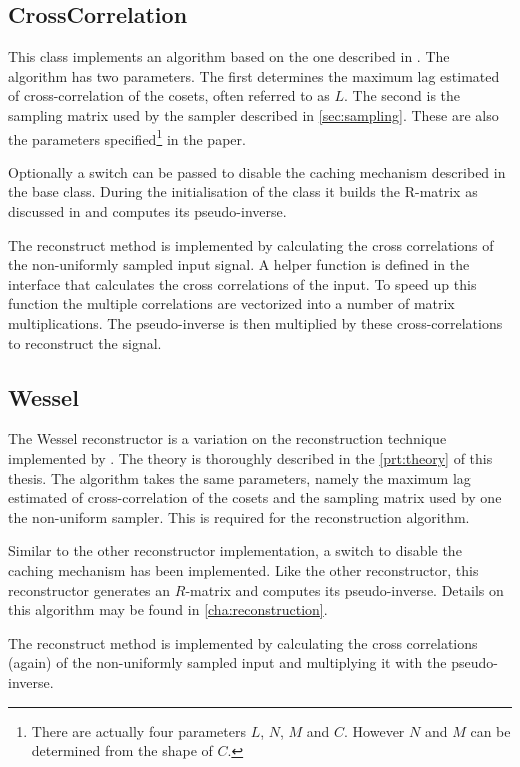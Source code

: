 \documentclass[a4paper, openany, oneside]{memoir}
\begin{document}
\subsection{CrossCorrelation}
\label{sub:crosscorrelation}
This class implements an algorithm based on the one described in \cite{ariananda2012compressive}. The algorithm has two parameters. The first determines the maximum lag estimated of cross-correlation of the cosets, often referred to as $L$. The second is the sampling matrix used by the sampler described in \cref{sec:sampling}. These are also the parameters specified\footnote{\label{fn:reconparam}There are actually four parameters $L$, $N$, $M$ and $C$. However $N$ and $M$ can be determined from the shape of $C$.} in the paper.

Optionally a switch can be passed to disable the caching mechanism described in the base class. During the initialisation of the class it builds the R-matrix as discussed in \cite{ariananda2012compressive} and computes its pseudo-inverse.

The reconstruct method is implemented by calculating the cross correlations of the non-uniformly sampled input signal. A helper function is defined in the  interface that calculates the cross correlations of the input. To speed up this function the multiple correlations are vectorized into a number of matrix multiplications. The pseudo-inverse is then multiplied by these cross-correlations to reconstruct the signal.

\subsection{Wessel}
\label{sub:wessel}
The Wessel reconstructor is a variation on the reconstruction technique implemented by . The theory is thoroughly described in the \cref{prt:theory} of this thesis. The algorithm takes the same parameters, namely the maximum lag estimated of cross-correlation of the cosets and the sampling matrix used by one the non-uniform sampler. This is required for the reconstruction algorithm.

Similar to the other reconstructor implementation, a switch to disable the caching mechanism has been implemented. Like the other reconstructor, this reconstructor generates an $R$-matrix and computes its pseudo-inverse. Details on this algorithm may be found in \cref{cha:reconstruction}.

The reconstruct method is implemented by calculating the cross correlations (again) of the non-uniformly sampled input and multiplying it with the pseudo-inverse.
\end{document}
